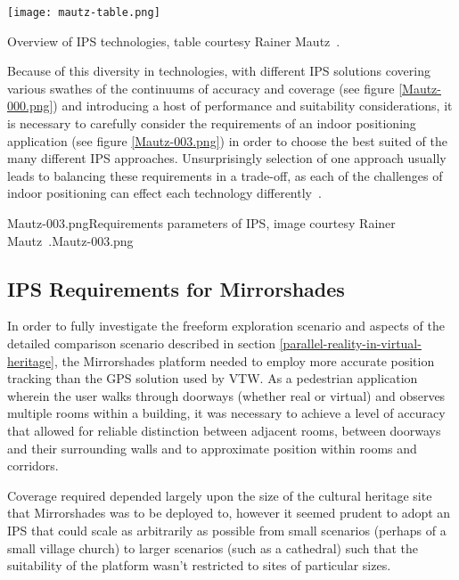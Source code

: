 \begin{table}[h]
	\begin{center}
		\texttt{[image: mautz-table.png]}
	\end{center}
	\caption{Overview of IPS technologies, table courtesy Rainer Mautz~\cite{Mautz2012}.}
	\label{mautz-table.png}
\end{table}

Because of this diversity in technologies, with different IPS solutions covering various swathes of the continuums of accuracy and coverage (see figure \ref{Mautz-000.png}) and introducing a host of performance and suitability considerations, it is necessary to carefully consider the requirements of an indoor positioning application (see figure \ref{Mautz-003.png}) in order to choose the best suited of the many different IPS approaches. Unsurprisingly selection of one approach usually leads to balancing these requirements in a trade-off, as each of the challenges of indoor positioning can effect each technology differently~\cite{Mautz2009}.

       {Mautz-003.png}{Requirements parameters of IPS, image courtesy Rainer Mautz~\cite{Mautz2012}.}{Mautz-003.png}


\subsection{IPS Requirements for Mirrorshades}
\label{ips-requirements-for-mirrorshades}
In order to fully investigate the freeform exploration scenario and aspects of the detailed comparison scenario described in section \ref{parallel-reality-in-virtual-heritage}, the Mirrorshades platform needed to employ more accurate position tracking than the GPS solution used by VTW. As a pedestrian application wherein the user walks through doorways (whether real or virtual) and observes multiple rooms within a building, it was necessary to achieve a level of accuracy that allowed for reliable distinction between adjacent rooms, between doorways and their surrounding walls and to approximate position within rooms and corridors.

Coverage required depended largely upon the size of the cultural heritage site that Mirrorshades was to be deployed to, however it seemed prudent to adopt an IPS that could scale as arbitrarily as possible from small scenarios (perhaps of a small village church) to larger scenarios (such as a cathedral) such that the suitability of the platform wasn't restricted to sites of particular sizes.

